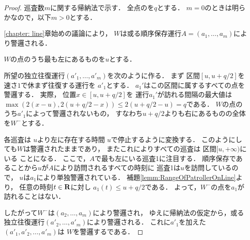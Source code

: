 \begin{proof}
  \newcommand{\leftmostpoint}{u}  %
  \newcommand{\leftmostpatroller}{巡査1}

  巡査数$m$に関する帰納法で示す．
  全点の{\maxIdletime}を$q$とする．
  $m = 0$のときは明らかなので，以下$m > 0$とする．

  \ref{chapter: line}章始めの議論により，
  $W$は或る順序保存運行$A = (a_1, \ldots, a_m)$により警邏される．

  $W$の点のうち最も左にあるものを$\leftmostpoint$とする．

  所望の独立往復運行$(a' _1, \dots, a' _m)$を次のように作る．
  まず
  区間$[\leftmostpoint, \leftmostpoint + q/2]$を速さ$1$で休まず往復する運行を
  $a' _1$とする．
  $a_1'$はこの区間に属するすべての点を警邏する．
  実際，
  位置$x \in [u, u + q/2]$を
  運行$a_1'$が訪れる間隔の最大値は
  $ \max( 2(x - \leftmostpoint), 2(\leftmostpoint + q/2 - x) )
    \leq 2(\leftmostpoint + q/2 - \leftmostpoint) = q$である．
  $W$の点のうち$a' _1$によって警邏されないもの，
  すなわち$u + q / 2$よりも右にあるものの全体を$W ^-$とする．

  各巡査は
  $\leftmostpoint$より左に存在する時間
  $\leftmostpoint$で停止するように変換する．
  このようにしても$W$は警邏されたままであり，
  またこれによりすべての巡査は
  区間$[\leftmostpoint, +\infty)$にいる
  ことになる．
  ここで，$A$で最も左にいる{\leftmostpatroller}に注目する．
  順序保存であることから$\leftmostpoint$が$A$により訪問されるすべての時刻に
  {\leftmostpatroller}は$\leftmostpoint$を訪問しているので，
  $\leftmostpoint$は$a_1$により単独警邏されている．
  補題\ref{lemm:RangeOfPatrollerOnLine}より，
  任意の時刻$t \in \mathbf R$に対し
  $a_1(t) \leq \leftmostpoint + q/2$である．
  よって，$W ^-$の点を$a _1$が訪れることはない．

  したがって$W ^-$は$(a _2, \ldots, a _m)$により警邏され，
  ゆえに帰納法の仮定から，或る独立往復運行$(a' _2, \ldots, a' _m)$により警邏される．
  これに$a' _1$を加えた$(a' _1, a' _2, \dots, a' _m)$は
  $W$を警邏する{\sepSectPatroll}である．
\end{proof}


